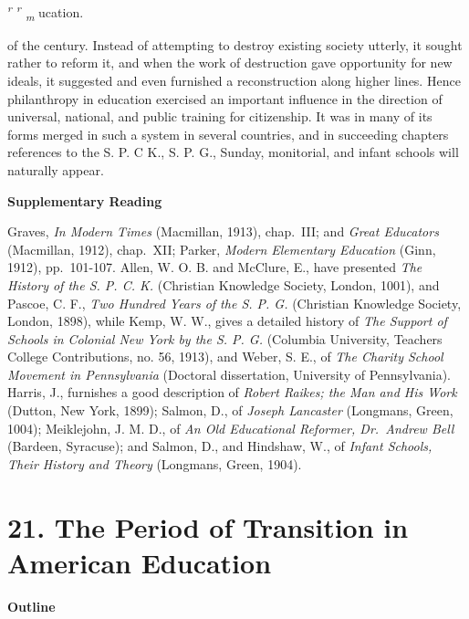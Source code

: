 \documentclass[
]{book}
\begin{document}
\emph{\textsuperscript{r} \textsuperscript{r} \textsubscript{m}} ucation.

of the century. Instead of attempting to destroy existing society utterly, it sought rather to reform it, and when the work of destruction gave opportunity for new\protect\hypertarget{ch20.xmlux5cux23para.311.1.0.box.283.244.1050.421.q.60}{}{ ideals, it suggested and even furnished a reconstruction along higher lines. Hence philanthropy in education exercised an important influence in the direction of universal, national, and public training for citizenship. It was in many of its forms merged in such a system in several countries, and in succeeding chapters references to the S. P. C K., S. P. G., Sunday, monitorial, and infant schools will naturally appear.}

\textbf{Supplementary Reading}

Graves, \emph{In Modern Times} (Macmillan, 1913), chap.~III; and \emph{Great Educators} (Macmillan, 1912), chap.~XII; Parker, \emph{Modern Elementary Education} (Ginn, 1912), pp.~101-107. Allen, W. O. B. and McClure, E., have presented \emph{The History of the S. P. C. K.} (Christian Knowledge Society, London, 1001), and Pascoe, C. F., \emph{Two Hundred Years of the S. P. G.} (Christian Knowledge Society, London, 1898), while Kemp, W. W., gives a detailed history of \emph{The Support of Schools in Colonial New York by the S. P. G.} (Columbia University, Teachers College Contributions, no. 56, 1913), and Weber, S. E., of \emph{The Charity School Movement in Pennsylvania} (Doctoral dissertation, University of Pennsylvania). Harris, J., furnishes a good description of \emph{Robert Raikes; the Man and His Work} (Dutton, New York, 1899); Salmon, D., of \emph{Joseph Lancaster} (Longmans, Green, 1004); Meiklejohn, J. M. D., of \emph{An Old Educational Reformer, Dr.~Andrew Bell} (Bardeen, Syracuse); and Salmon, D., and Hindshaw, W., of \emph{Infant Schools, Their History and Theory} (Longmans, Green, 1904).

\hypertarget{the-period-of-transition-in-american-education}{%
\chapter{21. The Period of Transition in American Education}\label{the-period-of-transition-in-american-education}}

\textbf{Outline}
\end{document}
